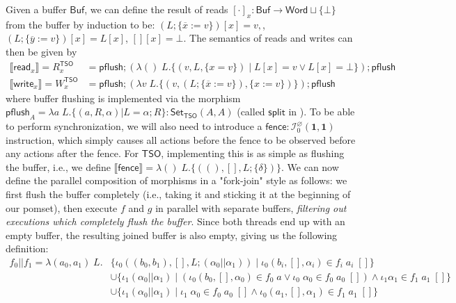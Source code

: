 \documentclass[acmsmall,screen,review]{acmart}
\newcommand{\mc}[1]{\ensuremath{\mathcal{#1}}}
\newcommand{\mb}[1]{\ensuremath{\mathbf{#1}}}
\newcommand{\ms}[1]{\ensuremath{\mathsf{#1}}}
\newcommand{\dnt}[1]{\llbracket{#1}\rrbracket}
\newcommand{\bufloc}[1]{\overline{#1}}
\begin{document}
Given a buffer \(\ms{Buf}\), we can define the result of reads \([\cdot]_x:
\ms{Buf} \to \ms{Word} \sqcup \{\bot\}\) from the buffer by induction to be:
\(
  (L;\{\bufloc{x} := v\})[x] = v,
\),
\(
  (L;\{\bufloc{y} := v\})[x] = L[x]
\),
\(
  [][x] = \bot
\).
The semantics of reads and writes can then be given by
\begin{equation}
  \begin{aligned}
  \dnt{\ms{read}_x} = R_x^{\ms{TSO}} 
    &= \ms{pflush};(\lambda ()\;L. \{(v, L, \{x = v\}) \mid L[x] = v \lor L[x] = \bot\});\ms{pflush} \\
  \dnt{\ms{write}_x} = W_x^{\ms{TSO}}
    &= \ms{pflush};(\lambda v\;L. \{(v, (L;\{\bufloc{x} := v\}), \{x := v\})\});\ms{pflush}
  \end{aligned}
\end{equation}
where buffer flushing is implemented via the morphism 
\(
  \ms{pflush}_A = \lambda a\;L. \{(a, R, \alpha) | L = \alpha;R\}
  : \ms{Set}_{\ms{TSO}}(A, A)
\)
(called \(\ms{split}\) in \cite{sparky}). To be able to perform synchronization,
we will also need to introduce a \(\ms{fence}: \mc{I}^\varnothing_0(\mb{1},
\mb{1})\) instruction, which simply causes all actions before the fence to be
observed before any actions after the fence. For \(\ms{TSO}\), implementing this
is as simple as flushing the buffer, i.e., we define
\(
  \dnt{\ms{fence}} = \lambda ()\;L. \{((), [], L;\{\delta\})\}
\).
We can now define the parallel composition of morphisms in a "fork-join" style
as follows: we first flush the buffer completely (i.e., taking it and sticking
it at the beginning of our pomset), then execute \(f\) and \(g\) in parallel
with separate buffers, \textit{filtering out executions which completely flush
the buffer}. Since both threads end up with an empty buffer, the resulting
joined buffer is also empty, giving us the following definition:
\begin{equation}
  \begin{aligned}
    f_0 || f_1 = \lambda (a_0, a_1)\;L. 
    & \{\iota_0 ((b_0, b_1), [], L;(\alpha_0 || \alpha_1)) 
      \mid \iota_0 (b_i, [], \alpha_i) \in f_i\;a_i\;[]\} 
    \\ & \cup \{\iota_1 (\alpha_0 || \alpha_1) \mid (\iota_0 (b_0, [], \alpha_0) \in f_0\;a \lor \iota_0\;\alpha_0 \in f_0\;a_0\;[]) \land \iota_1 \alpha_1 \in f_1\;a_1\;[]\} 
    \\ & \cup \{\iota_1 (\alpha_0 || \alpha_1) \mid \iota_1\;\alpha_0 \in f_0\;a_0\;[] \land \iota_0 (a_1, [], \alpha_1) \in f_1\;a_1\;[]\}
    \end{aligned}
\end{equation}
\end{document}
